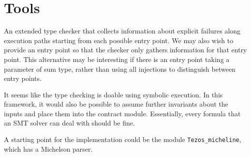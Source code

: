 \documentclass[a4paper]{llncs}
\begin{document}
\clearpage
\section{Tools}
\label{sec:tools}

An extended type checker that collects information about explicit failures along execution paths
starting from each possible entry point. We may also wish to provide an entry point so that the
checker only gathers information for that entry point. This alternative may be interesting if there
is an entry point taking a parameter of sum type, rather than using all injections to distinguish
between entry points.

It seems like the type checking is doable using symbolic execution. In this framework, it would also
be possible to assume further invariants about the inputs and place them into the contract
module. Essentially, every formula that an SMT solver can deal with should be fine.

A starting point for the implementation could be the module \lstinline/Tezos_micheline/, which has a
Michelson parser. 
\end{document}
